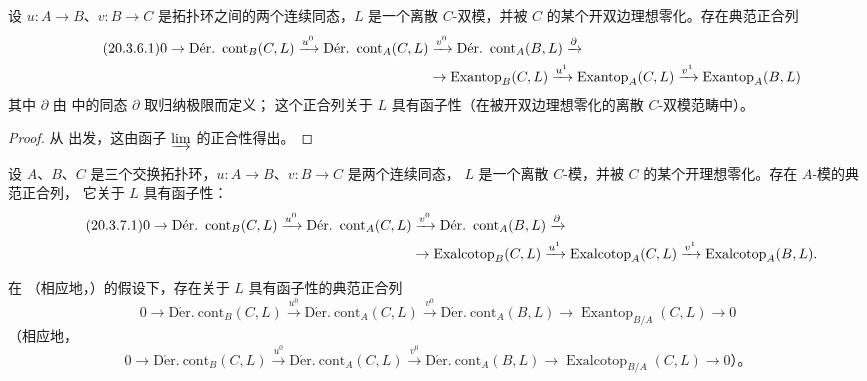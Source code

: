 \begin{proposition}[20.3.6]
\label{0.20.3.6-fr}
设 $u:A\to B$、$v:B\to C$ 是拓扑环之间的两个连续同态，$L$ 是一个离散
$C$-双模，并被 $C$ 的某个开双边理想零化。存在典范正合列
\begin{align}
\tag{20.3.6.1}
\label{0.20.3.6.1-fr}
  0\to\operatorname{D\acute{e}r.\ cont}_B(C,L)\xrightarrow{u^0}
  \operatorname{D\acute{e}r.\ cont}_A(C,L)&\xrightarrow{v^0}
  \operatorname{D\acute{e}r.\ cont}_A(B,L)\xrightarrow{\partial} \\
  &\to\operatorname{Exantop}_B(C,L)\xrightarrow{u^1}
  \operatorname{Exantop}_A(C,L)\xrightarrow{v^1}
  \operatorname{Exantop}_A(B,L) \notag
\end{align}
其中 $\partial$ 由  中的同态 $\partial$ 取归纳极限而定义；
这个正合列关于 $L$ 具有函子性（在被开双边理想零化的离散 $C$-双模范畴中）。
\end{proposition}

\begin{proof}
从  出发，这由函子 $\varinjlim$ 的正合性得出。
\end{proof}

\begin{corollary}[20.3.7]
\label{0.20.3.7-fr}
设 $A$、$B$、$C$ 是三个交换拓扑环，$u:A\to B$、$v:B\to C$ 是两个连续同态，
$L$ 是一个离散 $C$-模，并被 $C$ 的某个开理想零化。存在 $A$-模的典范正合列，
它关于 $L$ 具有函子性：
\begin{align}
\tag{20.3.7.1}
\label{0.20.3.7.1-fr}
  0\to\operatorname{D\acute{e}r.\ cont}_B(C,L)\xrightarrow{u^0}
  \operatorname{D\acute{e}r.\ cont}_A(C,L)&\xrightarrow{v^0}
  \operatorname{D\acute{e}r.\ cont}_A(B,L)\xrightarrow{\partial} \\
  &\to\operatorname{Exalcotop}_B(C,L)\xrightarrow{u^1}
  \operatorname{Exalcotop}_A(C,L)\xrightarrow{v^1}
  \operatorname{Exalcotop}_A(B,L). \notag
\end{align}
\end{corollary}

\begin{corollary}[20.3.8]
\label{0.20.3.8-fr}
在 （相应地，）的假设下，存在关于 $L$
具有函子性的典范正合列
\begin{equation}
\tag{20.3.8.1}
\label{0.20.3.8.1-fr}
  0\to\operatorname{D\acute{e}r.\ cont}_B(C,L)\xrightarrow{u^0}
  \operatorname{D\acute{e}r.\ cont}_A(C,L)\xrightarrow{v^0}
  \operatorname{D\acute{e}r.\ cont}_A(B,L)\to
  \operatorname{Exantop}_{B/A}(C,L)\to0
\end{equation}
（相应地，
\begin{equation}
\tag{20.3.8.2}
\label{0.20.3.8.2-fr}
  0\to\operatorname{D\acute{e}r.\ cont}_B(C,L)\xrightarrow{u^0}
  \operatorname{D\acute{e}r.\ cont}_A(C,L)\xrightarrow{v^0}
  \operatorname{D\acute{e}r.\ cont}_A(B,L)\to
  \operatorname{Exalcotop}_{B/A}(C,L)\to0\text{）。}
\end{equation}
\end{corollary}

